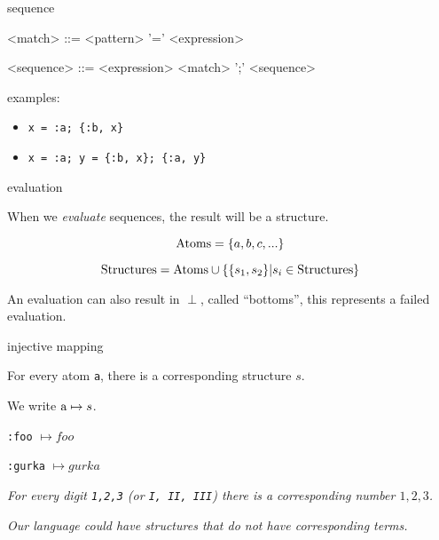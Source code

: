 \begin{frame}{sequence}

\begin{grammar}
  <match> ::=  <pattern> '=' <expression>
\end{grammar}

\pause
\begin{grammar}
  <sequence> ::=  <expression> \alt <match> ';' <sequence>
\end{grammar}

\pause\vspace{20pt}

examples:
 \begin{itemize}
   \pause \item {\tt x = :a; \{:b, x\}}
   \pause \item {\tt x = :a; y = \{:b, x\}; \{:a, y\}}
 \end{itemize}

\end{frame}

\begin{frame}{evaluation}

  When we {\em evaluate} sequences, the result will be a structure.
  \pause\vspace{10pt}

$${\rm Atoms} =  \{a,b,c, ...\}$$

$${\rm Structures} = {\rm Atoms} \cup \{\{s_1, s_2\} | s_i \in {\rm Structures}\}$$

\pause \vspace{20pt}
An evaluation can also result in $\perp$, called ``bottoms'', this represents a failed evaluation.

\end{frame}

\begin{frame}{injective mapping}

\pause \vspace{20pt}
For every atom {\tt a}, there is a corresponding structure $s$.

\vspace{10pt}
\hspace{40pt}We write ${\rm a} \mapsto s$.

\pause \vspace{10pt}
\hspace{40pt} {\tt :foo} $\mapsto foo$

\hspace{40pt} {\tt :gurka} $\mapsto gurka$


\pause \vspace{20pt}

{\em For every digit \texttt{1,2,3} (or \texttt{I, II, III}) there is a corresponding number $1,2,3$.}

\pause \vspace{20pt}
{\em Our language could have structures that do not have corresponding terms.}

\end{frame}


